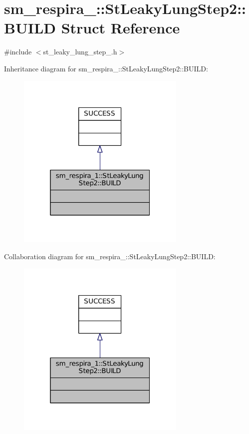 \hypertarget{structsm__respira__1_1_1StLeakyLungStep2_1_1BUILD}{}\section{sm\+\_\+respira\+\_\+:\+:St\+Leaky\+Lung\+Step2\+:\+:B\+U\+I\+LD Struct Reference}
\label{structsm__respira__1_1_1StLeakyLungStep2_1_1BUILD}


{\ttfamily \#include $<$st\+\_\+leaky\+\_\+lung\+\_\+step\+\_.\+h$>$}



Inheritance diagram for sm\+\_\+respira\+\_\+:\+:St\+Leaky\+Lung\+Step2\+:\+:B\+U\+I\+LD\+:
\nopagebreak
\begin{figure}[H]
\begin{center}
\leavevmode
\includegraphics[width=229pt]{structsm__respira__1_1_1StLeakyLungStep2_1_1BUILD__inherit__graph}
\end{center}
\end{figure}


Collaboration diagram for sm\+\_\+respira\+\_\+:\+:St\+Leaky\+Lung\+Step2\+:\+:B\+U\+I\+LD\+:
\nopagebreak
\begin{figure}[H]
\begin{center}
\leavevmode
\includegraphics[width=229pt]{structsm__respira__1_1_1StLeakyLungStep2_1_1BUILD__coll__graph}
\end{center}
\end{figure}


